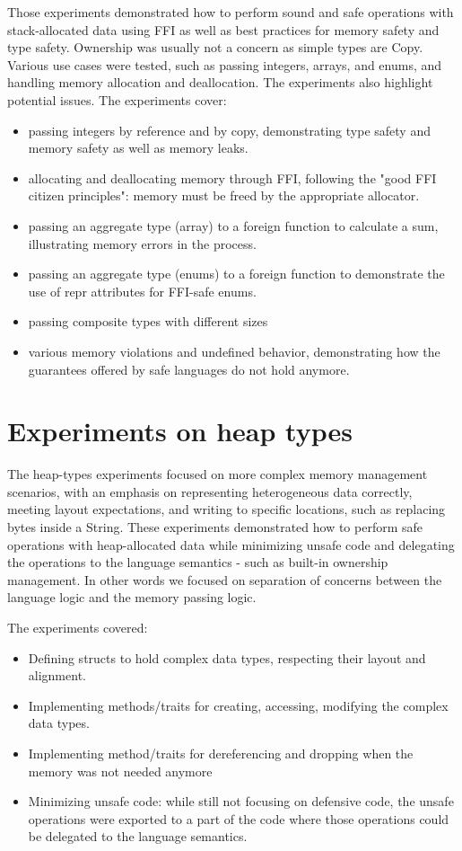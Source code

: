 \documentclass[nomenclature, english, bibtex]{kththesis}
\begin{document}
Those experiments demonstrated how to perform sound and safe operations with stack-allocated data using \gls{FFI}
as well as best practices for memory safety and type safety. Ownership was usually not a concern as simple types are Copy.
Various use cases were tested, such as passing integers, arrays, and enums, and handling memory allocation and deallocation. The experiments also highlight potential issues. The experiments cover:

\begin{itemize}
    \item passing integers by reference and by copy, demonstrating type safety and memory safety as well as memory leaks.
    \item allocating and deallocating memory through FFI, following the "good FFI citizen principles"\cite{gjengset_rust_2021}: memory must be freed by the appropriate allocator.
    \item passing an aggregate type (array) to a foreign function to calculate a sum, illustrating memory errors in the process.
     \item passing an aggregate type (enums) to a foreign function to demonstrate the use of repr attributes for FFI-safe enums.
     \item passing composite types with different sizes
     \item various memory violations and undefined behavior, demonstrating how the guarantees offered by safe languages do not hold anymore.
\end{itemize}
 
\section{Experiments on heap types}
The heap-types experiments focused on more complex memory management scenarios, with an emphasis on representing heterogeneous data correctly, meeting layout expectations, and writing to specific locations, such as replacing bytes inside a String. These experiments demonstrated how to perform safe operations with heap-allocated data while minimizing unsafe code and delegating the operations to the language semantics - such as built-in ownership management. In other words we focused on separation of concerns between the language logic and the memory passing logic.

The experiments covered:

\begin{itemize}
    \item Defining structs to hold complex data types, respecting their layout and alignment.
    \item Implementing methods/traits for creating, accessing, modifying the complex data types.
    \item Implementing method/traits for dereferencing and dropping when the memory was not needed anymore
    \item Minimizing unsafe code: while still not focusing on defensive code, the unsafe operations were exported to a part of the code where those operations could be delegated to the language semantics.   
\end{itemize}
\end{document}
